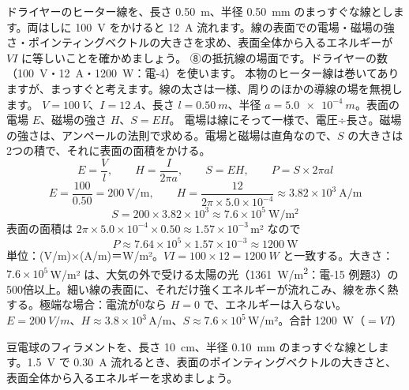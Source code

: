 \begin{phreidai}[ドライヤーのヒーター線に入るエネルギー]
\label{ph:電-14:ex5}ドライヤーのヒーター線を、長さ \qty{0.50}{m}、半径 \qty{0.50}{mm} のまっすぐな線とします。両はしに \qty{100}{V} をかけると \qty{12}{A} 流れます。線の表面での電場・磁場の強さ・ポインティングベクトルの大きさを求め、表面全体から入るエネルギーが $VI$ に等しいことを確かめましょう。
\phbamen
⑧の抵抗線の場面です。ドライヤーの数（\qty{100}{V}・\qty{12}{A}・\qty{1200}{W}：電-4）を使います。
\phmushi
本物のヒーター線は巻いてありますが、まっすぐと考えます。線の太さは一様、周りのほかの導線の場を無視します。
\phzu
$V=\qty{100}{V}$、$I=\qty{12}{A}$、長さ $l=\qty{0.50}{m}$、半径 $a=\qty{5.0e-4}{m}$。表面の電場 $E$、磁場の強さ $H$、$S=EH$。
\phriyu
電場は線にそって一様で、電圧÷長さ。磁場の強さは、アンペールの法則で求める。電場と磁場は直角なので、$S$ の大きさは2つの積で、それに表面の面積をかける。
\phtateru
\[ E=\frac{V}{l},\qquad H=\frac{I}{2\pi a},\qquad S=EH,\qquad P=S\times2\pi al \]
\phtoku
\[ E=\frac{100}{0.50}=200\ \mathrm{V/m},\qquad H=\frac{12}{2\pi\times5.0\times10^{-4}}\approx3.82\times10^3\ \mathrm{A/m} \]
\[ S=200\times3.82\times10^3\approx7.6\times10^5\ \mathrm{W/m^2} \]
表面の面積は $2\pi\times5.0\times10^{-4}\times0.50\approx1.57\times10^{-3}$\,m² なので
\[ P\approx7.64\times10^5\times1.57\times10^{-3}\approx1200\ \mathrm{W} \]
\phtashikame
単位：(V/m)×(A/m)＝W/m²。$VI=100\times12=\qty{1200}{W}$ と一致する。大きさ：$7.6\times10^5$\,W/m² は、大気の外で受ける太陽の光（\qty{1361}{W/m^2}：電-15 例題3）の500倍以上。細い線の表面に、それだけ強くエネルギーが流れこみ、線を赤く熱する。極端な場合：電流が0なら $H=0$ で、エネルギーは入らない。
\kotae $E=\qty{200}{V/m}$、$H\approx3.8\times10^3$\,A/m、$S\approx7.6\times10^5$\,W/m²。合計 \qty{1200}{W}（$=VI$）
\end{phreidai}
\begin{jibun}
豆電球のフィラメントを、長さ \qty{10}{cm}、半径 \qty{0.10}{mm} のまっすぐな線とします。\qty{1.5}{V} で \qty{0.30}{A} 流れるとき、表面のポインティングベクトルの大きさと、表面全体から入るエネルギーを求めましょう。
\end{jibun}

